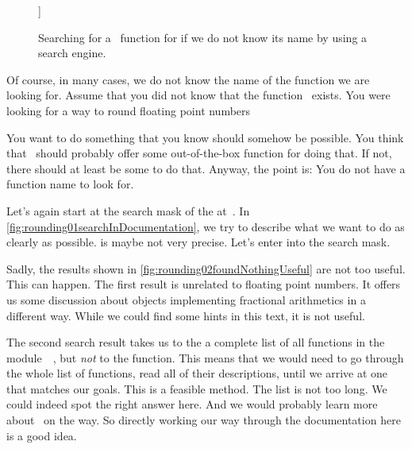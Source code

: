\begin{noglslink}
\begin{figure}
\label{fig:rounding04realPython}%
]{}%
%
\floatRowSep%
%
%
%
\floatSep%
%
%
%
\caption{Searching for a \python\ function for  if we do not know its name by using a search engine.}%
\label{fig:pythondoc:B}%
\end{figure}%
%
Of course, in many cases, we do not know the name of the function we are looking for.
Assume that you did not know that the function~ exists.
You were looking for a way to round floating point numbers 

You want to do something that you know should somehow be possible.
You think that \python\ should probably offer some out-of-the-box function for doing that.
If not, there should at least be some  to do that.
Anyway, the point is:
You do not have a function name to look for.

Let's again start at the search mask of the  at~.
In \cref{fig:rounding01searchInDocumentation}, we try to describe what we want to do as clearly as possible.
 is maybe not very precise.
Let's enter  into the search mask.

Sadly, the results shown in \cref{fig:rounding02foundNothingUseful} are not too useful.
This can happen.
The first result is unrelated to floating point numbers.
It offers us some discussion about objects implementing fractional arithmetics in a different way.
While we could find some hints in this text, it is not useful.

The second search result takes us to the a complete list of all functions in the module~~\cite{PSF:P3D:TPSL:MMF}, but \emph{not} to the  function.
This means that we would need to go through the whole list of functions, read all of their descriptions, until we arrive at one that matches our goals.
This is a feasible method.
The list is not too long.
We could indeed spot the right answer here.
And we would probably learn more about \python\ on the way.
So directly working our way through the documentation here is a good idea.


\end{noglslink}
